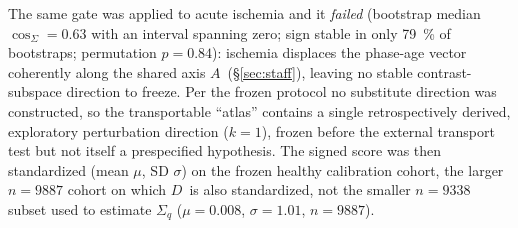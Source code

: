 \documentclass[11pt]{article}
\newcommand{\D}{\ensuremath{D}}
\newcommand{\A}{\ensuremath{A}}
\begin{document}
The same gate was applied to acute ischemia and it \emph{failed} (bootstrap median
$\cos_\Sigma=\num{0.63}$ with an interval spanning zero; sign stable in only
\SI{79}{\percent} of bootstraps; permutation $p=\num{0.84}$): ischemia displaces the
phase-age vector coherently along the shared axis \A\ (\S\ref{sec:staff}), leaving no
stable contrast-subspace direction to freeze. Per the frozen protocol no substitute
direction was constructed, so the transportable ``atlas'' contains a single
retrospectively derived, exploratory perturbation direction ($k=1$), frozen before
the external transport test but not itself a prespecified hypothesis. The signed score was then standardized (mean $\mu$, SD $\sigma$) on the frozen healthy
calibration cohort, the larger $n=\num{9887}$ cohort on which \D\ is also standardized, not the
smaller $n=\num{9338}$ subset used to estimate $\Sigma_q$ ($\mu=\num{0.008}$,
$\sigma=\num{1.01}$, $n=\num{9887}$).
\end{document}
